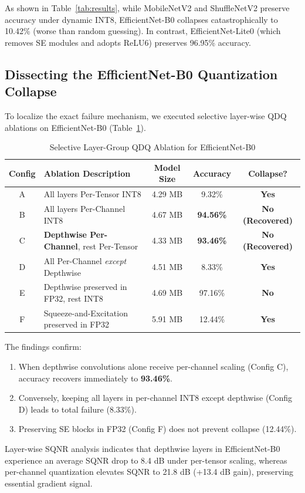 \documentclass[11pt,a4paper]{article}
\begin{document}
As shown in Table~\ref{tab:results}, while MobileNetV2 and ShuffleNetV2 preserve accuracy under dynamic INT8, EfficientNet-B0 collapses catastrophically to 10.42\% (worse than random guessing). In contrast, EfficientNet-Lite0 (which removes SE modules and adopts ReLU6) preserves 96.95\% accuracy.

\subsection{Dissecting the EfficientNet-B0 Quantization Collapse}
To localize the exact failure mechanism, we executed selective layer-wise QDQ ablations on EfficientNet-B0 (Table~\ref{tab:ablation}).

\begin{table}[htbp]
\centering
\caption{Selective Layer-Group QDQ Ablation for EfficientNet-B0}
\label{tab:ablation}
\small
\begin{tabular}{clccc}
\toprule
\textbf{Config} & \textbf{Ablation Description} & \textbf{Model Size} & \textbf{Accuracy} & \textbf{Collapse?} \\
\midrule
A & All layers Per-Tensor INT8 & 4.29 MB & 9.32\% & \textbf{Yes} \\
B & All layers Per-Channel INT8 & 4.67 MB & \textbf{94.56\%} & \textbf{No (Recovered)} \\
C & \textbf{Depthwise Per-Channel}, rest Per-Tensor & 4.33 MB & \textbf{93.46\%} & \textbf{No (Recovered)} \\
D & All Per-Channel \textit{except} Depthwise & 4.51 MB & 8.33\% & \textbf{Yes} \\
E & Depthwise preserved in FP32, rest INT8 & 4.69 MB & 97.16\% & \textbf{No} \\
F & Squeeze-and-Excitation preserved in FP32 & 5.91 MB & 12.44\% & \textbf{Yes} \\
\bottomrule
\end{tabular}
\end{table}

The findings confirm:
\begin{enumerate}
    \item When depthwise convolutions alone receive per-channel scaling (Config C), accuracy recovers immediately to \textbf{93.46\%}.
    \item Conversely, keeping all layers in per-channel INT8 except depthwise (Config D) leads to total failure (8.33\%).
    \item Preserving SE blocks in FP32 (Config F) does not prevent collapse (12.44\%).
\end{enumerate}
Layer-wise SQNR analysis indicates that depthwise layers in EfficientNet-B0 experience an average SQNR drop to 8.4 dB under per-tensor scaling, whereas per-channel quantization elevates SQNR to 21.8 dB (+13.4 dB gain), preserving essential gradient signal.
\end{document}
